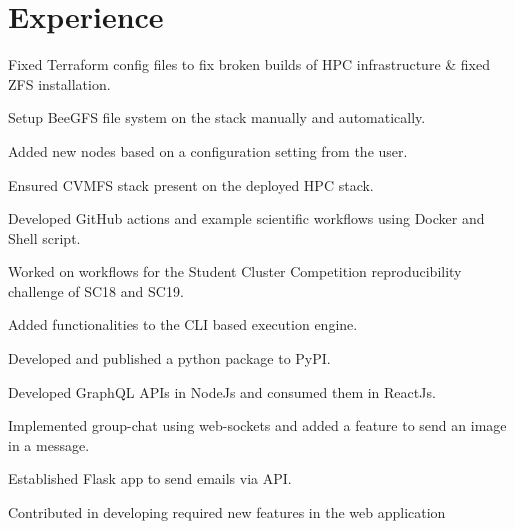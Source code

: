\documentclass[]{deedy-resume-openfont}
\begin{document}
\begin{minipage}[t]{0.66\textwidth} 


\section{Experience}

\vspace{\topsep} %
\begin{tightemize}
\item Fixed Terraform config files to fix broken builds of HPC infrastructure \& fixed ZFS installation.
\item Setup BeeGFS file system on the stack manually and automatically.
\item Added new nodes based on a configuration setting from the user.
\item Ensured CVMFS stack present on the deployed HPC stack.

\end{tightemize}
\sectionsep

\begin{tightemize}
\item Developed GitHub actions and example scientific workflows using Docker and Shell script.
\item Worked on workflows for the Student Cluster Competition reproducibility challenge of SC18 and SC19.
\item Added functionalities to the CLI based execution engine.
\item Developed and published a python package to PyPI.
\end{tightemize}
\sectionsep

\begin{tightemize}
\item Developed GraphQL APIs in NodeJs and consumed them in ReactJs.
\item  Implemented group-chat using web-sockets and added a feature to send an image
in a message.
\item Established Flask app to send emails via API.
\item Contributed in developing required new features in the web application
\end{tightemize}
\sectionsep


\end{minipage}
\end{document}
